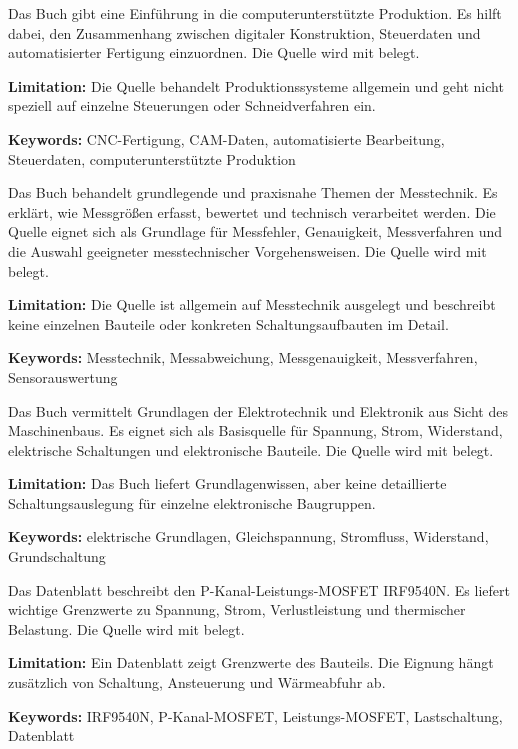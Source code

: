{ 
	Das Buch gibt eine Einführung in die computerunterstützte Produktion. Es hilft dabei, den Zusammenhang zwischen digitaler Konstruktion, Steuerdaten und automatisierter Fertigung einzuordnen. Die Quelle wird mit \cite{Hehenberger:2020} belegt.
	
	\bigskip
	
	\textbf{Limitation:} Die Quelle behandelt Produktionssysteme allgemein und geht nicht speziell auf einzelne Steuerungen oder Schneidverfahren ein.
	
	\scriptsize{\textbf{Keywords:} CNC-Fertigung, CAM-Daten, automatisierte Bearbeitung, Steuerdaten, computerunterstützte Produktion}
}



{ 
	Das Buch behandelt grundlegende und praxisnahe Themen der Messtechnik. Es erklärt, wie Messgrößen erfasst, bewertet und technisch verarbeitet werden. Die Quelle eignet sich als Grundlage für Messfehler, Genauigkeit, Messverfahren und die Auswahl geeigneter messtechnischer Vorgehensweisen. Die Quelle wird mit \cite{Helbig:2021} belegt.
	
	\bigskip
	
	\textbf{Limitation:} Die Quelle ist allgemein auf Messtechnik ausgelegt und beschreibt keine einzelnen Bauteile oder konkreten Schaltungsaufbauten im Detail.
	
	\scriptsize{\textbf{Keywords:} Messtechnik, Messabweichung, Messgenauigkeit, Messverfahren, Sensorauswertung}
}



{ 
	Das Buch vermittelt Grundlagen der Elektrotechnik und Elektronik aus Sicht des Maschinenbaus. Es eignet sich als Basisquelle für Spannung, Strom, Widerstand, elektrische Schaltungen und elektronische Bauteile. Die Quelle wird mit \cite{Hering:2012} belegt.
	
	\bigskip
	
	\textbf{Limitation:} Das Buch liefert Grundlagenwissen, aber keine detaillierte Schaltungsauslegung für einzelne elektronische Baugruppen.
	
	\scriptsize{\textbf{Keywords:} elektrische Grundlagen, Gleichspannung, Stromfluss, Widerstand, Grundschaltung}
}



{ 
	Das Datenblatt beschreibt den P-Kanal-Leistungs-MOSFET IRF9540N. Es liefert wichtige Grenzwerte zu Spannung, Strom, Verlustleistung und thermischer Belastung. Die Quelle wird mit \cite{IRF9540N:2025} belegt.
	
	\bigskip
	
	\textbf{Limitation:} Ein Datenblatt zeigt Grenzwerte des Bauteils. Die Eignung hängt zusätzlich von Schaltung, Ansteuerung und Wärmeabfuhr ab.
	
	\scriptsize{\textbf{Keywords:} IRF9540N, P-Kanal-MOSFET, Leistungs-MOSFET, Lastschaltung, Datenblatt}
}


